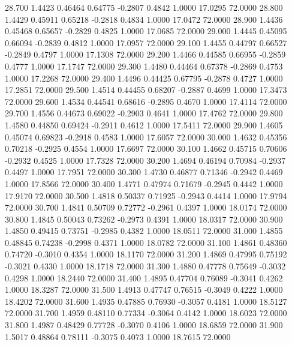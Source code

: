   28.700   1.4423   0.46464   0.64775  -0.2807   0.4842   1.0000  17.0295  72.0000
  28.800   1.4429   0.45911   0.65218  -0.2818   0.4834   1.0000  17.0472  72.0000
  28.900   1.4436   0.45468   0.65657  -0.2829   0.4825   1.0000  17.0685  72.0000
  29.000   1.4445   0.45095   0.66094  -0.2839   0.4812   1.0000  17.0957  72.0000
  29.100   1.4455   0.44797   0.66527  -0.2849   0.4797   1.0000  17.1308  72.0000
  29.200   1.4466   0.44585   0.66955  -0.2859   0.4777   1.0000  17.1747  72.0000
  29.300   1.4480   0.44464   0.67378  -0.2869   0.4753   1.0000  17.2268  72.0000
  29.400   1.4496   0.44425   0.67795  -0.2878   0.4727   1.0000  17.2851  72.0000
  29.500   1.4514   0.44455   0.68207  -0.2887   0.4699   1.0000  17.3473  72.0000
  29.600   1.4534   0.44541   0.68616  -0.2895   0.4670   1.0000  17.4114  72.0000
  29.700   1.4556   0.44673   0.69022  -0.2903   0.4641   1.0000  17.4762  72.0000
  29.800   1.4580   0.44850   0.69424  -0.2911   0.4612   1.0000  17.5411  72.0000
  29.900   1.4605   0.45074   0.69823  -0.2918   0.4583   1.0000  17.6057  72.0000
  30.000   1.4632   0.45356   0.70218  -0.2925   0.4554   1.0000  17.6697  72.0000
  30.100   1.4662   0.45715   0.70606  -0.2932   0.4525   1.0000  17.7328  72.0000
  30.200   1.4694   0.46194   0.70984  -0.2937   0.4497   1.0000  17.7951  72.0000
  30.300   1.4730   0.46877   0.71346  -0.2942   0.4469   1.0000  17.8566  72.0000
  30.400   1.4771   0.47974   0.71679  -0.2945   0.4442   1.0000  17.9170  72.0000
  30.500   1.4818   0.50337   0.71925  -0.2943   0.4414   1.0000  17.9794  72.0000
  30.700   1.4841   0.50709   0.72772  -0.2961   0.4397   1.0000  18.0174  72.0000
  30.800   1.4845   0.50043   0.73262  -0.2973   0.4391   1.0000  18.0317  72.0000
  30.900   1.4850   0.49415   0.73751  -0.2985   0.4382   1.0000  18.0511  72.0000
  31.000   1.4855   0.48845   0.74238  -0.2998   0.4371   1.0000  18.0782  72.0000
  31.100   1.4861   0.48360   0.74720  -0.3010   0.4354   1.0000  18.1170  72.0000
  31.200   1.4869   0.47995   0.75192  -0.3021   0.4330   1.0000  18.1718  72.0000
  31.300   1.4880   0.47778   0.75649  -0.3032   0.4298   1.0000  18.2440  72.0000
  31.400   1.4895   0.47704   0.76089  -0.3041   0.4262   1.0000  18.3287  72.0000
  31.500   1.4913   0.47747   0.76515  -0.3049   0.4222   1.0000  18.4202  72.0000
  31.600   1.4935   0.47885   0.76930  -0.3057   0.4181   1.0000  18.5127  72.0000
  31.700   1.4959   0.48110   0.77334  -0.3064   0.4142   1.0000  18.6023  72.0000
  31.800   1.4987   0.48429   0.77728  -0.3070   0.4106   1.0000  18.6859  72.0000
  31.900   1.5017   0.48864   0.78111  -0.3075   0.4073   1.0000  18.7615  72.0000
